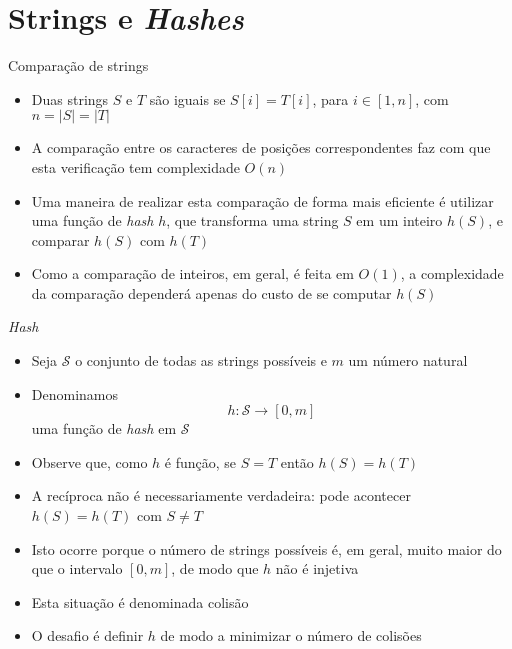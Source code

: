 \section{Strings e {\it Hashes}}

\begin{frame}[fragile]{Comparação de strings}

    \begin{itemize}
        \item Duas strings $S$ e $T$ são iguais se $S[i] = T[i]$, para $i\in [1,n]$, com
            $n = |S| = |T|$

        \item A comparação entre os caracteres de posições correspondentes faz com que esta
            verificação tem complexidade $O(n)$

        \item Uma maneira de realizar esta comparação de forma mais eficiente é utilizar uma 
            função de 
            \textit{hash} $h$, que transforma uma string $S$ em um inteiro $h(S)$, e comparar
            $h(S)$ com $h(T)$

        \item Como a comparação de inteiros, em geral, é feita em $O(1)$, a complexidade da 
            comparação dependerá apenas do custo de se computar $h(S)$
    \end{itemize}

\end{frame}

\begin{frame}[fragile]{{\it Hash}}

    \begin{itemize}
        \item Seja $\mathcal{S}$ o conjunto de todas as strings possíveis e $m$ um número natural

        \item Denominamos
        \[
            h: \mathcal{S} \to [0,m]
        \]
        uma função de \textit{hash} em $\mathcal{S}$

        \item Observe que, como $h$ é função, se $S = T$ então $h(S) = h(T)$

        \item A recíproca não é necessariamente verdadeira: pode acontecer $h(S) = h(T)$ com
            $S\neq T$

        \item Isto ocorre porque o número de strings possíveis é, em geral, muito maior do que
            o intervalo $[0,m]$, de modo que $h$ não é injetiva

        \item Esta situação é denominada colisão

        \item O desafio é definir $h$ de modo a minimizar o número de colisões

    \end{itemize}

\end{frame}

